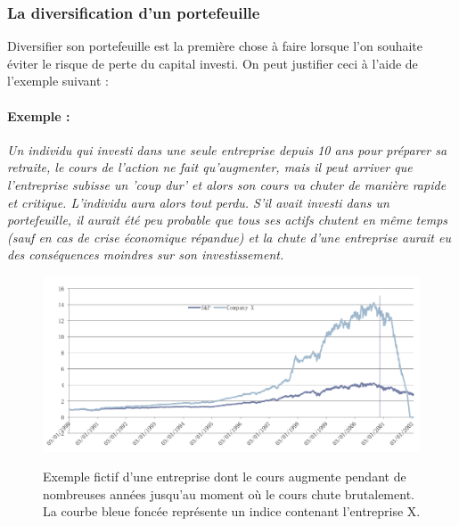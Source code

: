 \subsubsection{La diversification d'un portefeuille}
Diversifier son portefeuille est la première chose à faire lorsque l'on souhaite éviter le risque de perte du capital investi. On peut justifier ceci à l'aide de l'exemple suivant :

\paragraph{Exemple :} \textit{Un individu qui investi dans une seule entreprise depuis 10 ans pour préparer sa retraite, le cours de l'action ne fait qu'augmenter, mais il peut arriver que l'entreprise subisse un 'coup dur' et alors son cours va chuter de manière rapide et critique. L'individu aura alors tout perdu.
	  S'il avait investi dans un portefeuille, il aurait été peu probable que tous ses actifs chutent en même temps (sauf en cas de crise économique répandue) et la chute d'une entreprise aurait eu des conséquences moindres sur son investissement.}
	  \begin{figure}[H]
	    \center
	    \includegraphics[scale=0.4]{../graph/exempleChuteEntreprise.png} \\
	    \caption{Exemple fictif d'une entreprise dont le cours augmente pendant de nombreuses années jusqu'au moment où le cours chute brutalement. La courbe bleue foncée représente un indice contenant l'entreprise X.}
	  \end{figure}
	  

